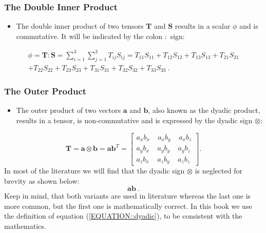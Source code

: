 \subsubsection{The Double Inner Product}
%
%
\begin{itemize}
   \item The double inner product of two tensors $\textbf{T}$ and $\textbf{S}$
   results in a scalar $\phi$ and is commutative. It will be indicated by
   the colon  $\boldsymbol \colon$ sign:
\end{itemize}
%
%
\begin{multline}
 \phi = \textbf{T} \boldsymbol \colon \textbf{S} = \sum_{i=1}^{3}\sum_{j=1}^{3} T_{ij} S_{ij}
=
 T_{11} S_{11} + T_{12} S_{12} + T_{13} S_{13} + T_{21} S_{21} \\
+
 T_{22} S_{22} +
 T_{23} S_{23} + T_{31} S_{31} + T_{32} S_{32} + T_{33} S_{33} ~.
\label{EQUATION::doubleInnerProduct}
\end{multline}
%
%
%
%
\subsubsection{The Outer Product}
%
%
\begin{itemize}
    \item The outer product of two vectors $\textbf{a}$ and $\textbf{b}$,
    also known as the dyadic product, results in a tensor, is non-commutative
    and is expressed by the dyadic sign $\otimes$:
\end{itemize}
%
%
%
\begin{equation}
  \textbf{T} = \textbf{a} \otimes \textbf{b} = \textbf{a} \textbf{b}^T =   \left[
  \begin{matrix}
   a_xb_x ~ ~ ~ ~ ~ a_xb_y ~ ~ ~ ~ ~ a_xb_z \\
   a_yb_x ~ ~ ~ ~ ~ a_yb_y ~ ~ ~ ~ ~ a_yb_z \\
   a_zb_x ~ ~ ~ ~ ~ a_zb_y ~ ~ ~ ~ ~ a_zb_z
  \end{matrix}
  \right].
   \label{EQUATION::dyadic}
\end{equation}
%
%
	In most of the literature we will find that the dyadic sign $\otimes$ is
    neglected for brevity as shown below:
%
%
\begin{equation}
  \textbf{a}\textbf{b}~.
  \label{EQUATION::outerProduct}
\end{equation}
%
%
	Keep in mind, that both variants are used in literature whereas the last
    one is more common, but the first one is mathematically correct. In this
    book we use the definition of equation (\ref{EQUATION::dyadic}), to be
    consistent with the mathematics.
%
%
%
%
